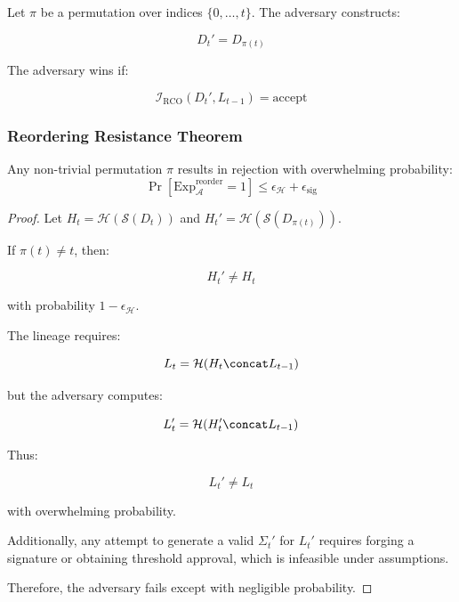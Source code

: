 Let $\pi$ be a permutation over indices $\{0, \dots, t\}$. The adversary constructs:

\begin{equation}
D_t' = D_{\pi(t)}
\end{equation}

The adversary wins if:

\begin{equation}
\mathcal{I}_{\text{RCO}}(D_t', L_{t-1}) = \text{accept}
\end{equation}

\subsubsection{Reordering Resistance Theorem}

\begin{theorem}
Any non-trivial permutation $\pi$ results in rejection with overwhelming probability:
\[
\Pr[\text{Exp}_{\mathcal{A}}^{\text{reorder}} = 1] \leq \epsilon_{\mathcal{H}} + \epsilon_{\text{sig}}
\]
\end{theorem}

\begin{proof}
Let $H_t = \mathcal{H}(\mathcal{S}(D_t))$ and $H_t' = \mathcal{H}(\mathcal{S}(D_{\pi(t)}))$.

If $\pi(t) \neq t$, then:

\begin{equation}
H_t' \neq H_t
\end{equation}

with probability $1 - \epsilon_{\mathcal{H}}$.

The lineage requires:

\begin{equation}
L_t = \mathcal{H}(H_t \concat L_{t-1})
\end{equation}

but the adversary computes:

\begin{equation}
L_t' = \mathcal{H}(H_t' \concat L_{t-1})
\end{equation}

Thus:

\begin{equation}
L_t' \neq L_t
\end{equation}

with overwhelming probability.

Additionally, any attempt to generate a valid $\Sigma_t'$ for $L_t'$ requires forging a signature or obtaining threshold approval, which is infeasible under assumptions.

Therefore, the adversary fails except with negligible probability.
\end{proof}

